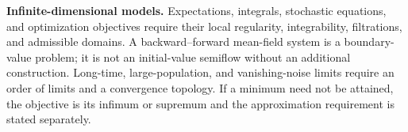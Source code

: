 \documentclass[11pt,a4paper]{article}
\begin{document}
\textbf{Infinite-dimensional models.} Expectations, integrals, stochastic
equations, and optimization objectives require their local regularity,
integrability, filtrations, and admissible domains. A backward--forward
mean-field system is a boundary-value problem; it is not an initial-value
semiflow without an additional construction. Long-time, large-population,
and vanishing-noise limits require an order of limits and a convergence
topology. If a minimum need not be attained, the objective is its infimum
or supremum and the approximation requirement is stated separately.
\end{document}
